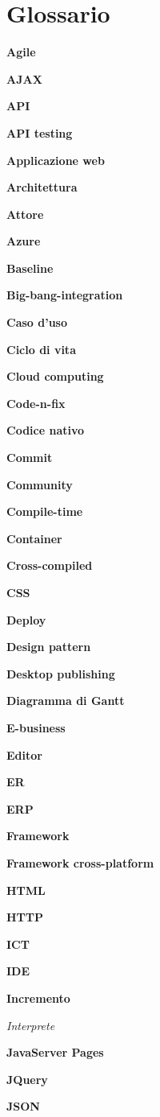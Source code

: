 \chapter{Glossario}

\textbf{Agile}

\textbf{AJAX}

\textbf{API}

\textbf{API testing}

\textbf{Applicazione web}

\textbf{Architettura}

\textbf{Attore}

\textbf{Azure}

\textbf{Baseline}

\textbf{Big-bang-integration}

\textbf{Caso d'uso}

\textbf{Ciclo di vita}

\textbf{Cloud computing}

\textbf{Code-n-fix}

\textbf{Codice nativo}

\textbf{Commit}

\textbf{Community}

\textbf{Compile-time}

\textbf{Container}

\textbf{Cross-compiled}

\textbf{CSS}

\textbf{Deploy}

\textbf{Design pattern}

\textbf{Desktop publishing}

\textbf{Diagramma di Gantt}

\textbf{E-business}

\textbf{Editor}

\textbf{ER}

\textbf{ERP}

\textbf{Framework}

\textbf{Framework cross-platform}

\textbf{HTML}

\textbf{HTTP}

\textbf{ICT}

\textbf{IDE}

\textbf{Incremento}

\textit{Interprete}

\textbf{JavaServer Pages}

\textbf{JQuery}

\textbf{JSON}

